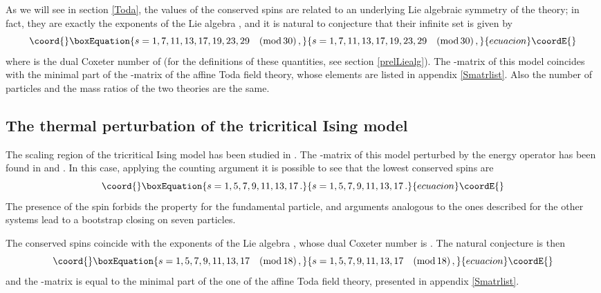 \documentclass[a4paper,12pt]{report}
\begin{document}
As we will see in section \ref{Toda}, the values of the conserved spins are related to an underlying Lie
algebraic symmetry of the theory; in fact, they are exactly the exponents of the Lie algebra \coordHE{}, and it is
natural to conjecture that their infinite set is given by
\begin{equation}\coord{}\boxEquation{
s=1,7,11,13,17,19,23,29\quad(\textrm{mod}\, 30)\,,
}{
s=1,7,11,13,17,19,23,29\quad(\textrm{mod}\, 30)\,,
}{ecuacion}\coordE{}\end{equation}
where \coordHE{} is the dual Coxeter number of \coordHE{} (for the definitions of these quantities, see section
\ref{prelLiealg}). The \coordHE{}-matrix of this model coincides with the minimal part of the \coordHE{}-matrix of the \coordHE{}
affine Toda field theory, whose elements are listed in appendix \ref{Smatrlist}. Also the number of particles and
the mass ratios of the two theories are the same.


\subsection{The thermal perturbation of the tricritical Ising model}

The scaling region of the tricritical Ising model has been studied in \cite{TIMscaling}. The \coordHE{}-matrix of this
model perturbed by the energy operator \coordHE{} has been found in \cite{fatzam} and
\cite{chrmuss1}. In this case, applying the counting argument it is possible to see that the lowest conserved
spins are
\begin{equation}\coord{}\boxEquation{
s=1,5,7,9,11,13,17\,.
}{
s=1,5,7,9,11,13,17\,.
}{ecuacion}\coordE{}\end{equation}
The presence of the spin \coordHE{} forbids the \coordHE{} property for the fundamental particle, and arguments
analogous to the ones described for the other systems lead to a bootstrap closing on seven particles.

The conserved spins coincide with the exponents of the Lie algebra \coordHE{}, whose dual Coxeter number is \coordHE{}. The
natural conjecture is then
\begin{equation}\coord{}\boxEquation{
s=1,5,7,9,11,13,17 \quad (\textrm{mod}\, 18)\,,
}{
s=1,5,7,9,11,13,17 \quad (\textrm{mod}\, 18)\,,
}{ecuacion}\coordE{}\end{equation}
and the \coordHE{}-matrix is equal to the minimal part of the one of the \coordHE{} affine Toda field theory, presented in
appendix \ref{Smatrlist}.
\end{document}
